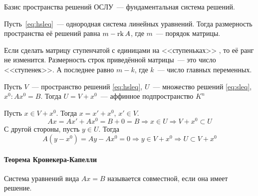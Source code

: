 \documentclass[12pt]{../../../notes}
\begin{document}
\begin{defn}\label{defn:fundsol}
  Базис пространства решений ОСЛУ~--- фундаментальная система решений.
\end{defn}

\begin{thrm}\label{thrm:dimsolnslq}
  Пусть~\eqref{eq:hsleq}~--- однородная система линейных уравнений. Тогда размерность
  пространства её решений равна $m - \operatorname{rk} A$, где $m$~--- порядок матрицы.
\end{thrm}
\begin{ittproof}
  Если сделать матрицу ступенчатой с единицами на <<ступеньках>> , то её ранг не изменится. 
  Размерность строк приведённой матрицы~--- это число <<ступенек>>. 
  А последнее равно $m-k$, где $k$~--- число главных переменных.
\end{ittproof}

\begin{thrm}\label{thrm:homtoordlinsys}
  Пусть $V$~--- пространство решений \eqref{eq:hsleq}, $U$~--- множество решений \eqref{eq:sleq},
  $x^0\colon Ax^0 = B$. Тогда $U =  V+ x^0$~--- аффинное подпространство $K^n$ 
\end{thrm}
\begin{ittproof}
  Пусть $x \in V + x^0$. Тогда $x = x'+ x^0$, $x' \in V$.
  \[
    A x = Ax' + Ax^0 = B + 0 = B \Rightarrow x\in U \Rightarrow V + x^0 \subset U
  \]
  С другой стороны, пусть $y \in U$. Тогда 
  \[
    A(y - x^0) = Ay - Ax^0 = 0 \Rightarrow y \in V+x^0 \Rightarrow U \subset V+ x^0 
  \]
\end{ittproof}

\paragraph{Теорема Кронекера-Капелли}

\begin{defn}\label{defn:compsysleq}
  Система уравнений вида $Ax=B$ называется совместной, если она имеет решение.
\end{defn}
\end{document}
